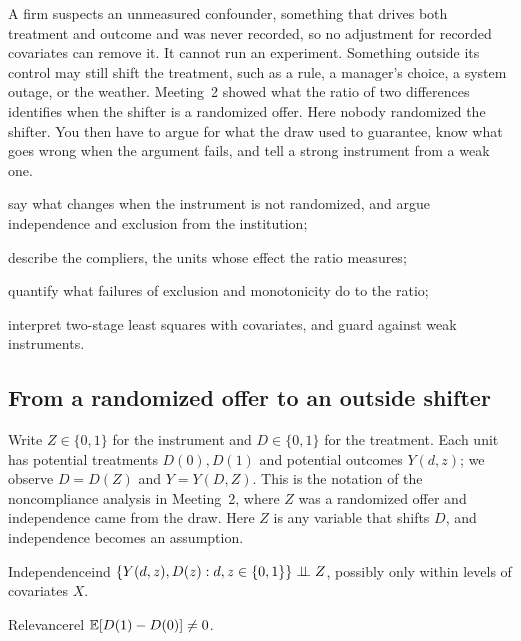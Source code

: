 \documentclass[11pt]{article}
\begin{document}

\begin{decision}
A firm suspects an unmeasured confounder, something that drives both treatment and outcome and was never recorded, so no
adjustment for recorded covariates can remove it. It cannot run an experiment. Something outside its control may still shift
the treatment, such as a rule, a manager's choice, a system outage, or the weather. Meeting~2 showed what the ratio of two
differences identifies when the shifter is a randomized offer. Here nobody randomized the shifter. You then have to argue
for what the draw used to guarantee, know what goes wrong when the argument fails, and tell a strong instrument from a weak one.
\end{decision}

\begin{goals}
  \item say what changes when the instrument is not randomized, and argue independence and exclusion from the institution;
  \item describe the compliers, the units whose effect the ratio measures;
  \item quantify what failures of exclusion and monotonicity do to the ratio;
  \item interpret two-stage least squares with covariates, and guard against weak instruments.
\end{goals}

\sectionone

\subsection{From a randomized offer to an outside shifter}

Write $Z \in \{0,1\}$ for the instrument and $D \in \{0,1\}$ for the treatment. Each unit has potential treatments
$D(0), D(1)$ and potential outcomes $Y(d, z)$; we observe $D = D(Z)$ and $Y = Y(D, Z)$. This is the notation of the
noncompliance analysis in Meeting~2, where $Z$ was a randomized offer and independence came from the draw. Here $Z$ is any
variable that shifts $D$, and independence becomes an assumption.

\begin{assum}{Independence}{ind}
$\{Y(d,z), D(z) : d, z \in \{0,1\}\} \perp\!\!\!\perp Z$, possibly only within levels of covariates $X$.
\end{assum}
\begin{assum}{Relevance}{rel}
$\mathbb{E}[D(1) - D(0)] \ne 0$.
\end{assum}
\end{document}
